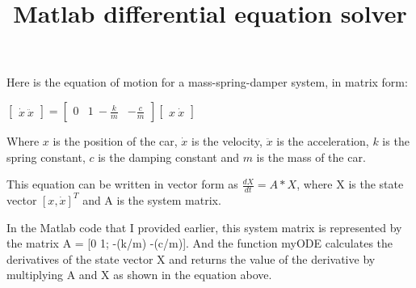 \documentclass{article}
\title{Matlab differential equation solver}
\begin{document}
\maketitle

Here is the equation of motion for a mass-spring-damper system, in matrix form:

$\begin{bmatrix} \dot{x} \ \ddot{x} \end{bmatrix} = \begin{bmatrix} 0 & 1 \ -\frac{k}{m} & -\frac{c}{m} \end{bmatrix} \begin{bmatrix} x \ \dot{x} \end{bmatrix}$

Where $x$ is the position of the car, $\dot{x}$ is the velocity, $\ddot{x}$ is the acceleration, $k$ is the spring constant, $c$ is the damping constant and $m$ is the mass of the car.

This equation can be written in vector form as $\frac{dX}{dt} = A*X$, where X is the state vector $[x,\dot{x}]^T$ and A is the system matrix.

In the Matlab code that I provided earlier, this system matrix is represented by the matrix A = [0 1; -(k/m) -(c/m)]. And the function myODE calculates the derivatives of the state vector X and returns the value of the derivative by multiplying A and X as shown in the equation above.
\end{document}
